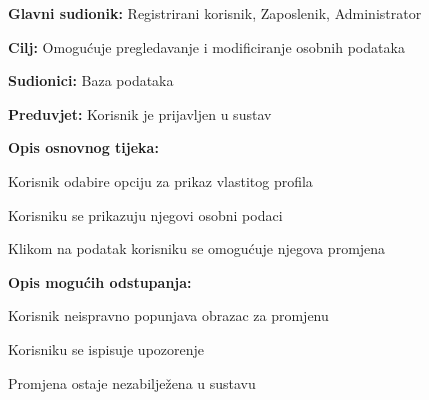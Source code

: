 \noindent {}
\begin{packed_item}
	
	\item \textbf{Glavni sudionik: } Registrirani korisnik, Zaposlenik, Administrator
	\item  \textbf{Cilj:} Omogućuje pregledavanje i modificiranje osobnih podataka
	\item  \textbf{Sudionici:} Baza podataka
	\item  \textbf{Preduvjet:} Korisnik je prijavljen u sustav
	\item  \textbf{Opis osnovnog tijeka:}
	
	\item[] \begin{packed_enum}
		
		\item Korisnik odabire opciju za prikaz vlastitog profila
		\item Korisniku se prikazuju njegovi osobni podaci
		\item Klikom na podatak korisniku se omogućuje njegova promjena

	\end{packed_enum}
	
	\item  \textbf{Opis mogućih odstupanja:}
	
	\item[] \begin{packed_item}
		
		\item[2.a] Korisnik neispravno popunjava obrazac za promjenu
		\item[] \begin{packed_enum}
			
			\item Korisniku se ispisuje upozorenje
			\item Promjena ostaje nezabilježena u sustavu
			
		\end{packed_enum}
	\end{packed_item}
\end{packed_item}

